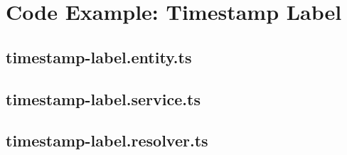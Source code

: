 \appendix 
\section{Code Example: Timestamp Label} 

\subsection{timestamp-label.entity.ts}\label{ex:tl-entity}



\subsection{timestamp-label.service.ts}\label{ex:tl-service}



\subsection{timestamp-label.resolver.ts}\label{ex:tl-resolver}

